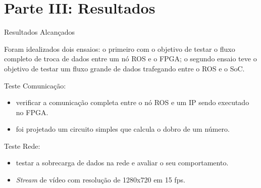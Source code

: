 \documentclass[10pt]{beamer}
\begin{document}
\section{Parte III: Resultados}


\begin{frame}{Resultados Alcançados}
    \begin{alertblock}{}
		\begin{justify}
			Foram idealizados dois ensaios: o primeiro com o objetivo de testar o fluxo completo de troca de dados entre um nó ROS e o FPGA; o segundo ensaio teve o objetivo de testar um fluxo grande de dados trafegando entre o ROS e o SoC.
		\end{justify}
        \begin{block}{Teste Comunicação:}
            \begin{itemize}
                \item verificar a comunicação completa entre o nó ROS e um IP sendo executado no FPGA.
                \item foi projetado um circuito simples que	calcula o dobro de um número.
            \end{itemize}
        \end{block}
		\vspace{0.25cm}
        \begin{block}{Teste Rede:}
            \begin{itemize}
                \item testar a sobrecarga de dados na rede e avaliar o seu comportamento.
                \item \textit{Stream} de vídeo com resolução de 1280x720 em 15 fps.
            \end{itemize}
        \end{block}
    \end{alertblock}
\end{frame}
\end{document}
